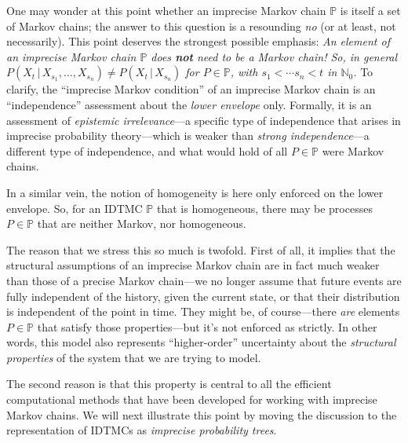 \documentclass[graybox]{svmult}
\newcommand{\nats}{\mathbb{N}}
\newcommand{\natswith}{\nats_{0}}
\begin{document}
One may wonder at this point whether an imprecise Markov chain $\mathbb{P}$ is itself a set of Markov chains; the answer to this question is a resounding \emph{no} (or at least, not necessarily). This point deserves the strongest possible emphasis:
\quad\newline\newline
\noindent \emph{An element of an imprecise Markov chain $\mathbb{P}$ does {\bf not} need to be a Markov chain! So, in general $P(X_t\,\vert\,X_{s_1},\ldots,X_{s_n})\neq P(X_t\,\vert\,X_{s_n})$ for $P\in\mathbb{P}$, with $s_1<\cdots s_n<t$ in $\natswith$.}
\quad\newline\newline
To clarify, the ``imprecise Markov condition'' of an imprecise Markov chain is an ``independence'' assessment about the \emph{lower envelope} only. Formally, it is an assessment of \emph{epistemic irrelevance}---a specific type of independence that arises in imprecise probability theory---which is weaker than \emph{strong independence}---a different type of independence, and what would hold of all $P\in\mathbb{P}$ were Markov chains.

In a similar vein, the notion of homogeneity is here only enforced on the lower envelope. So, for an IDTMC $\mathbb{P}$ that is homogeneous, there may be processes $P\in\mathbb{P}$ that are neither Markov, nor homogeneous.

The reason that we stress this so much is twofold. First of all, it implies that the structural assumptions of an imprecise Markov chain are in fact much weaker than those of a precise Markov chain---we no longer assume that future events are fully independent of the history, given the current state, or that their distribution is independent of the point in time. They might be, of course---there \emph{are} elements $P\in\mathbb{P}$ that satisfy those properties---but it's not enforced as strictly. In other words, this model also represents ``higher-order'' uncertainty about the \emph{structural properties} of the system that we are trying to model.

The second reason is that this property is central to all the efficient computational methods that have been developed for working with imprecise Markov chains. We will next illustrate this point by moving the discussion to the representation of IDTMCs as \emph{imprecise probability trees}.

\end{document}
